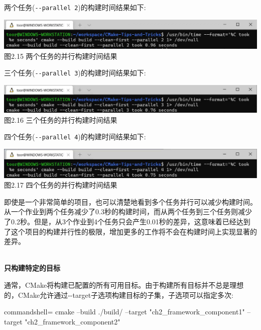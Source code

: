 两个任务(\texttt{-{}-parallel 2})的构建时间结果如下:

\begin{center}
\includegraphics[width=1.\textwidth]{content/1/chapter2/images/15.jpg}\\
图2.15 两个任务的并行构建时间结果
\end{center}

三个任务(\texttt{-{}-parallel 3})的构建时间结果如下:

\begin{center}
\includegraphics[width=1.\textwidth]{content/1/chapter2/images/16.jpg}\\
图2.16 三个任务的并行构建时间结果
\end{center}

四个任务(\texttt{-{}-parallel 4})的构建时间结果如下:

\begin{center}
\includegraphics[width=1.\textwidth]{content/1/chapter2/images/17.jpg}\\
图2.17 四个任务的并行构建时间结果
\end{center}

即使是一个非常简单的项目，也可以清楚地看到多个任务并行可以减少构建时间。从一个作业到两个任务减少了0.3秒的构建时间，而从两个任务到三个任务则减少了0.2秒。但是，从3个作业到4个任务只会产生0.01秒的差异，这意味着已经达到了这个项目的构建并行性的极限，增加更多的工作将不会在构建时间上实现显著的差异。

\hspace*{\fill} \\ %
\noindent
\textbf{只构建特定的目标}

通常，CMake将构建已配置的所有可用目标。由于构建所有目标并不总是理想的，CMake允许通过-{}-target子选项构建目标的子集，子选项可以指定多次:

\begin{tcblisting}{commandshell={}}
cmake --build ./build/ --target "ch2_framework_component1"
--target "ch2_framework_component2"
\end{tcblisting}

